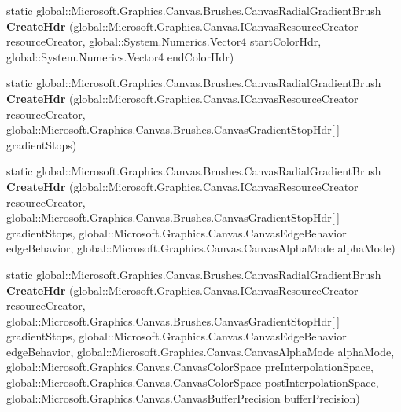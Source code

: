\begin{DoxyCompactItemize}
static global\+::\+Microsoft.\+Graphics.\+Canvas.\+Brushes.\+Canvas\+Radial\+Gradient\+Brush {\bfseries Create\+Hdr} (global\+::\+Microsoft.\+Graphics.\+Canvas.\+I\+Canvas\+Resource\+Creator resource\+Creator, global\+::\+System.\+Numerics.\+Vector4 start\+Color\+Hdr, global\+::\+System.\+Numerics.\+Vector4 end\+Color\+Hdr)
\item 
\mbox{\label{class_microsoft_1_1_graphics_1_1_canvas_1_1_brushes_1_1_canvas_radial_gradient_brush_aef0da396142c3d6724253585940535e0}} 
static global\+::\+Microsoft.\+Graphics.\+Canvas.\+Brushes.\+Canvas\+Radial\+Gradient\+Brush {\bfseries Create\+Hdr} (global\+::\+Microsoft.\+Graphics.\+Canvas.\+I\+Canvas\+Resource\+Creator resource\+Creator, global\+::\+Microsoft.\+Graphics.\+Canvas.\+Brushes.\+Canvas\+Gradient\+Stop\+Hdr\mbox{[}$\,$\mbox{]} gradient\+Stops)
\item 
\mbox{\label{class_microsoft_1_1_graphics_1_1_canvas_1_1_brushes_1_1_canvas_radial_gradient_brush_a56c87e8ee5b2516dfc061d3207cbba62}} 
static global\+::\+Microsoft.\+Graphics.\+Canvas.\+Brushes.\+Canvas\+Radial\+Gradient\+Brush {\bfseries Create\+Hdr} (global\+::\+Microsoft.\+Graphics.\+Canvas.\+I\+Canvas\+Resource\+Creator resource\+Creator, global\+::\+Microsoft.\+Graphics.\+Canvas.\+Brushes.\+Canvas\+Gradient\+Stop\+Hdr\mbox{[}$\,$\mbox{]} gradient\+Stops, global\+::\+Microsoft.\+Graphics.\+Canvas.\+Canvas\+Edge\+Behavior edge\+Behavior, global\+::\+Microsoft.\+Graphics.\+Canvas.\+Canvas\+Alpha\+Mode alpha\+Mode)
\item 
\mbox{\label{class_microsoft_1_1_graphics_1_1_canvas_1_1_brushes_1_1_canvas_radial_gradient_brush_a51c1cc7d4745f7d2f3e322b078cc04cb}} 
static global\+::\+Microsoft.\+Graphics.\+Canvas.\+Brushes.\+Canvas\+Radial\+Gradient\+Brush {\bfseries Create\+Hdr} (global\+::\+Microsoft.\+Graphics.\+Canvas.\+I\+Canvas\+Resource\+Creator resource\+Creator, global\+::\+Microsoft.\+Graphics.\+Canvas.\+Brushes.\+Canvas\+Gradient\+Stop\+Hdr\mbox{[}$\,$\mbox{]} gradient\+Stops, global\+::\+Microsoft.\+Graphics.\+Canvas.\+Canvas\+Edge\+Behavior edge\+Behavior, global\+::\+Microsoft.\+Graphics.\+Canvas.\+Canvas\+Alpha\+Mode alpha\+Mode, global\+::\+Microsoft.\+Graphics.\+Canvas.\+Canvas\+Color\+Space pre\+Interpolation\+Space, global\+::\+Microsoft.\+Graphics.\+Canvas.\+Canvas\+Color\+Space post\+Interpolation\+Space, global\+::\+Microsoft.\+Graphics.\+Canvas.\+Canvas\+Buffer\+Precision buffer\+Precision)

\end{DoxyCompactItemize}
